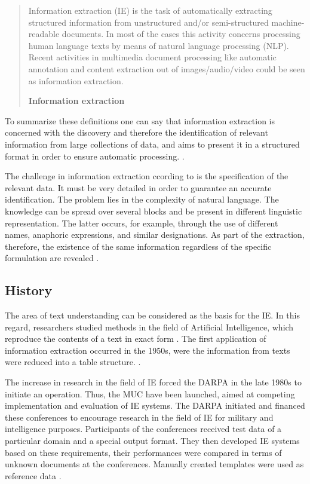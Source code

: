 \begin{quote}
Information extraction (IE) is the task of automatically extracting structured information from unstructured and/or semi-structured machine-readable documents. In most of the cases this activity concerns processing human language texts by means of natural language processing (NLP). Recent activities in multimedia document processing like automatic annotation and content extraction out of images/audio/video could be seen as information extraction.

\hfill \textbf{Information extraction}

\hfill \citeauthor{Wikipedia:IE:2012} \cite{Wikipedia:IE:2012}
\end{quote}

To summarize these definitions one can say that information extraction is concerned with the discovery and therefore the identification of relevant information from large collections of data, and aims to present it in a structured format in order to ensure automatic processing. \cite{Lehnert:1994}\cite{Neumann:2001}\cite{Siefkes:2007}.

The challenge in information extraction ccording to \cite{Grishman:2003} is the specification of the relevant data. It must be very detailed in order to guarantee an accurate identification. The problem lies in the complexity of natural language. The knowledge can be spread over several blocks and be present in different linguistic representation. The latter occurs, for example, through the use of different names, anaphoric expressions, and similar designations. As part of the extraction, therefore, the existence of the same information regardless of the specific formulation are revealed \cite{Cole:1998}\cite{Grishman:2003}\cite{Grishman:2007}\cite{Linsmayr:2010}.

\newpage
\subsection{History}
The area of text understanding can be considered as the basis for the \gls{IE}. In this regard, researchers studied methods in the field of Artificial Intelligence, which reproduce the contents of a text in exact form \cite{Siefkes:2007}\cite{Eikvil:1999}. The first application of information extraction occurred in the 1950s, were  the information from texts  were reduced into a table structure. \cite{Grishman:1997}\cite{Gaizauskas:1998}\cite{Wilks:1997}.

The increase in research in the field of IE forced the \gls{DARPA} in the late 1980s to initiate an operation. Thus, the \gls{MUC} have been launched, aimed at competing implementation and evaluation of IE systems. The \gls{DARPA} initiated and financed these conferences to encourage research in the field of \gls{IE} for military and intelligence purposes. Participants of the conferences received test data of a particular domain and a special output format. They then developed IE systems based on these requirements, their performances were compared in terms of unknown documents at the conferences. Manually created templates were used as reference data \cite{Grishman:1996}\cite{Grishman:1997}.


